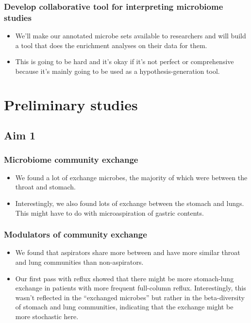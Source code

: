 \documentclass[12pt]{article}
\begin{document}
\subsubsection{Develop collaborative tool for interpreting microbiome studies}
\begin{itemize}
\item We'll make our annotated microbe sets available to researchers and will build a 
tool that does the enrichment analyses on their data for them.
\item This is going to be hard and it's okay if it's not perfect or comprehensive
because it's mainly going to be used as a hypothesis-generation tool.
\end{itemize}

\section{Preliminary studies}

\subsection{Aim 1}
\subsubsection{Microbiome community exchange}

\begin{itemize}
\item We found a lot of exchange microbes, the majority of which were between the throat and stomach. 
\item Interestingly, we also found lots of exchange between the stomach and lungs. This might have to do with microaspiration of gastric contents. 
\end{itemize}

\subsubsection{Modulators of community exchange}

\begin{itemize}
\item We found that aspirators share more between and have more similar throat and lung communities than non-aspirators.
\item Our first pass with reflux showed that there might be more stomach-lung exchange 
in patients with more frequent full-column reflux. Interestingly, this wasn't reflected 
in the ``exchanged microbes'' but rather in the beta-diversity of stomach and lung 
communities, indicating that the exchange might be more stochastic here.
\end{itemize}
\end{document}
